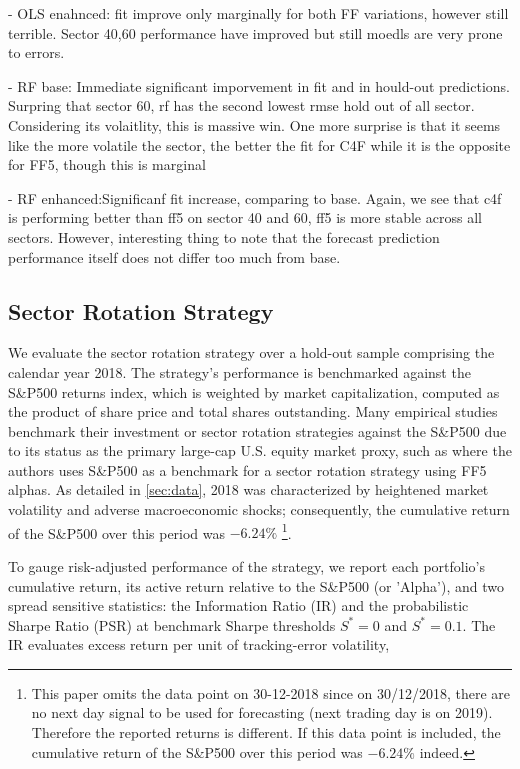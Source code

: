 - OLS enahnced: fit improve only marginally for both FF variations, however still terrible. Sector 40,60 performance have improved but still moedls are very prone to errors.

- RF base: Immediate significant imporvement in fit and in hould-out predictions. Surpring that sector 60, rf has the second lowest rmse hold out of all sector. Considering its volaitlity, this is massive win. One more surprise is that it seems like the more volatile the sector, the better the fit for C4F while it is the opposite for FF5, though this is marginal

- RF enhanced:Significanf fit increase, comparing to base. Again, we see that c4f is performing better than ff5 on sector 40 and 60, ff5 is more stable across all sectors. However, interesting thing to note that the forecast prediction performance itself does not differ too much from base.

\subsection{Sector Rotation Strategy}
We evaluate the sector rotation strategy over a hold-out sample comprising the calendar year 2018. The strategy's performance is benchmarked against the S\&P500 returns index, which is weighted by market capitalization, computed as the product of share price and total shares outstanding. Many empirical studies benchmark their investment or sector rotation strategies against the S\&P500 due to its status as the primary large-cap U.S. equity market proxy, such as  where the authors uses S\&P500 as a benchmark for a sector rotation strategy using FF5 alphas. As detailed in \cref{sec:data}, 2018 was characterized by heightened market volatility and adverse macroeconomic shocks; consequently, the cumulative return of the S\&P500 over this period was $-6.24\%$ \footnote{This paper omits the data point on 30-12-2018 since on 30/12/2018, there are no next day signal to be used for forecasting (next trading day is on 2019). Therefore the reported returns is different. If this data point is included, the cumulative return of the S\&P500 over this period was $-6.24\%$ indeed.}.

To gauge risk-adjusted performance of the strategy, we report each portfolio's cumulative return, its active return relative to the S\&P500 (or 'Alpha'), and two spread sensitive statistics: the Information Ratio (IR) and the probabilistic Sharpe Ratio (PSR) at benchmark Sharpe thresholds $S^{*}=0$ and $S^{*}=0.1$. The IR evaluates excess return per unit of tracking-error volatility,

